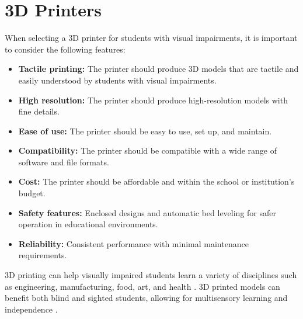 \section{3D Printers}\label{ch5:sec:3d-printers}
When selecting a 3D printer for students with visual impairments, it is important to consider the following features:
\begin{itemize}
	\item \textbf{Tactile printing:} The printer should produce 3D models that are tactile and easily understood by students with visual impairments.
	\item \textbf{High resolution:} The printer should produce high-resolution models with fine details.
	\item \textbf{Ease of use:} The printer should be easy to use, set up, and maintain.
	\item \textbf{Compatibility:} The printer should be compatible with a wide range of software and file formats.
	\item \textbf{Cost:} The printer should be affordable and within the school or institution's budget.
	\item \textbf{Safety features:} Enclosed designs and automatic bed leveling for safer operation in educational environments.
	\item \textbf{Reliability:} Consistent performance with minimal maintenance requirements.
\end{itemize}

3D printing can help visually impaired students learn a variety of disciplines such as engineering, manufacturing, food, art, and health \supercite{Karbowski2020, TeachThought2021}. 3D printed models can benefit both blind and sighted students, allowing for multisensory learning and independence \supercite{MatterHackers2017, DassaultEducation}.

